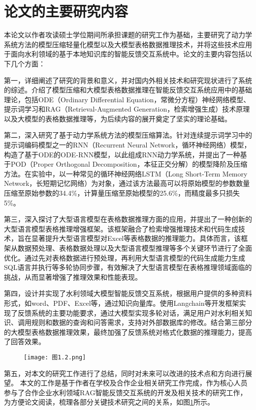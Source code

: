 \section{论文的主要研究内容}
本论文以作者攻读硕士学位期间所承担课题的研究工作为基础，主要研究了动力学系统方法的模型压缩轻量化模型以及大模型表格数据推理技术，并将这些技术应用于面向水利领域的基于本地知识库的智能反馈交互系统中。论文的主要内容包括以下几个方面： 

第一，详细阐述了研究的背景和意义，并对国内外相关技术和研究现状进行了系统的综述。介绍了模型压缩和大模型表格数据推理在智能反馈交互系统应用中的基础理论，包括ODE（Ordinary Differential Equation，常微分方程）神经网络模型、提示词学习和RAG（Retrieval-Augmented Generation，检索增强生成）技术原理以及大模型的表格数据推理等，为后续内容的展开奠定了坚实的理论基础。 

第二，深入研究了基于动力学系统方法的模型压缩算法。针对连续提示词学习中的提示词编码模型之一的RNN（Recurrent Neural Network，循环神经网络）模型，构造了基于ODE的ODE-RNN模型，以此组成RNN动力学系统，并提出了一种基于POD（Proper Orthogonal Decomposition，本征正交分解）的模型降阶及压缩方法。在实验中，以一种常见的循环神经网络LSTM（Long Short-Term Memory Network，长短期记忆网络）为对象，通过该方法最高可以将原始模型的参数数量压缩至原始参数的34.4\%，计算量压缩至原始模型的25.6\%，而精度最多只损失5\%。

第三，深入探讨了大型语言模型在表格数据推理方面的应用，并提出了一种创新的大型语言模型表格推理增强框架。该框架融合了检索增强推理技术和代码生成技术，旨在显著提升大型语言模型对Excel等表格数据的推理能力。具体而言，该框架从数据预处理、表格数据处理以及大型语言模型推理等多个关键环节进行了全面优化。通过先对表格数据进行预处理，再利用大型语言模型的代码生成能力生成SQL语言并执行等多轮协同步骤，有效解决了大型语言模型在表格推理领域面临的挑战，从而显著增强了推理效果和性能表现。

第四，设计并实现了水利领域大模型智能反馈交互系统，根据用户提供的多种资料形式，如word、PDF、Excel等，通过知识向量库。使用Langchain等开发框架实现了反馈系统的主要功能要求，通过大模型实现多轮对话，满足用户对水利相关知识、调用规则和数据的查询和问答需求，支持对外部数据库的修改。结合第三部分的大模型表格数据推理效果，最终加强了反馈系统对格式化数据的推理能力，提高了回答效果。
\begin{figure}[!h]
  \centering
  \texttt{[image: 图1.2.png]}
  \label{fig:章节架构}
\end{figure}

第五，对本文的研究工作进行了总结，同时对未来可以改进的技术点和方向进行展望。
本文的工作是基于作者在学校及合作企业相关研究工作完成，作为核心人员参与了合作企业水利领域RAG智能反馈交互系统的开发及相关技术的研究工作，为方便论文阅读，梳理各部分关键技术研究之间的关系，如图\ref{fig:章节架构}所示。

